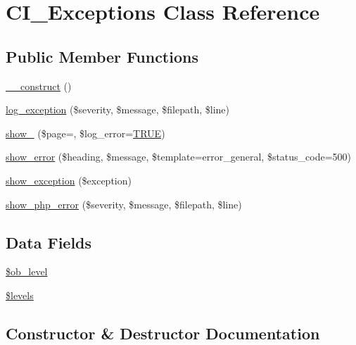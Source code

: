 \hypertarget{class_c_i___exceptions}{}\section{C\+I\+\_\+\+Exceptions Class Reference}
\label{class_c_i___exceptions}
\subsection*{Public Member Functions}
\begin{DoxyCompactItemize}
\item 
\mbox{\hyperlink{class_c_i___exceptions_a095c5d389db211932136b53f25f39685}{\+\_\+\+\_\+construct}} ()
\item 
\mbox{\hyperlink{class_c_i___exceptions_a477bd3360509887aeb6e0a56bcdcad2a}{log\+\_\+exception}} (\$severity, \$message, \$filepath, \$line)
\item 
\mbox{\hyperlink{class_c_i___exceptions_aaee13338b10f986f23d77eabcaf40fec}{show\+\_}} (\$page=\textquotesingle{}\textquotesingle{}, \$log\+\_\+error=\mbox{\hyperlink{constants_8php_ae04a3efe6aa42044f803ee90c2277846}{T\+R\+UE}})
\item 
\mbox{\hyperlink{class_c_i___exceptions_a4214456af4ed4c4d7a292939dea95257}{show\+\_\+error}} (\$heading, \$message, \$template=\textquotesingle{}error\+\_\+general\textquotesingle{}, \$status\+\_\+code=500)
\item 
\mbox{\hyperlink{class_c_i___exceptions_a6ad5ac9b245835caf69b6d3de1f48a85}{show\+\_\+exception}} (\$exception)
\item 
\mbox{\hyperlink{class_c_i___exceptions_a7962c30cacf1341dac1c44d8ab57cebe}{show\+\_\+php\+\_\+error}} (\$severity, \$message, \$filepath, \$line)
\end{DoxyCompactItemize}
\subsection*{Data Fields}
\begin{DoxyCompactItemize}
\item 
\mbox{\hyperlink{class_c_i___exceptions_abb6b6587dbaf0238bf26829c8df05d59}{\$ob\+\_\+level}}
\item 
\mbox{\hyperlink{class_c_i___exceptions_a1035dc0448354cc79f8f9e1ca8dfd0cb}{\$levels}}
\end{DoxyCompactItemize}


\subsection{Constructor \& Destructor Documentation}
\mbox{\label{class_c_i___exceptions_a095c5d389db211932136b53f25f39685}} 

